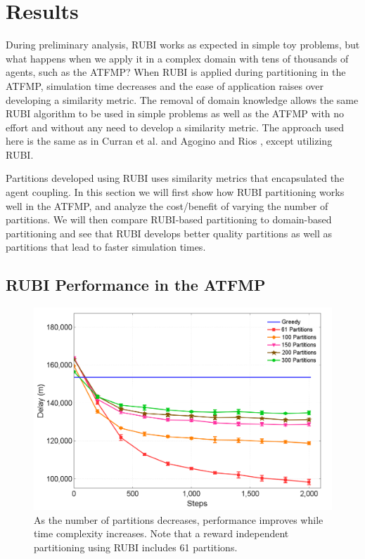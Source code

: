 \documentclass[letterpaper]{article}
\begin{document}
\section{Results}

During preliminary analysis, RUBI works as expected in simple toy problems, but what happens when we apply it in a complex domain with tens of thousands of agents, such as the ATFMP? When RUBI is applied during partitioning in the ATFMP, simulation time decreases and the ease of application raises over developing a similarity metric. The removal of domain knowledge allows the same RUBI algorithm to be used in simple problems as well as the ATFMP with no effort and without any need to develop a similarity metric. The approach used here is the same as in Curran et al. \cite{Curran:2013:AHC:2484920.2485183} and Agogino and Rios \cite{Agogino:2009:EEM:1570256.1570258,Rios}, except utilizing RUBI.

Partitions developed using RUBI uses similarity metrics that encapsulated the agent coupling. In this section we will first show how RUBI partitioning works well in the ATFMP, and analyze the cost/benefit of varying the number of partitions. We will then compare RUBI-based partitioning to domain-based partitioning and see that RUBI develops better quality partitions as well as partitions that lead to faster simulation times.


\subsection{RUBI Performance in the ATFMP}

\begin{figure}
\centering
\includegraphics[width=1.0\columnwidth]{ATFMPNewvsGreedy}
\caption{As the number of partitions decreases, performance improves while time complexity increases. Note that a reward independent partitioning using RUBI includes 61 partitions. }
\label{ATFMPNewvsGreedy}
\end{figure}
\end{document}
